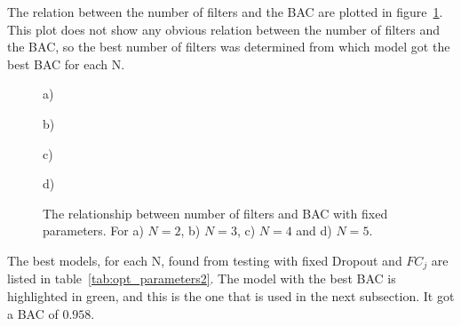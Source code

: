 The relation between the number of filters and the BAC are plotted in figure~\ref{fig:filter_acc}. This plot does not show any obvious relation between the number of filters and the BAC, so the best number of filters was determined from which model got the best BAC for each N.

\begin{figure}[H]
    \centering
    \begin{minipage}[b]{0.42\textwidth}
        
        \vspace{-0.5cm}
        \caption*{a)}
    \end{minipage}
    \begin{minipage}[b]{0.42\textwidth}
        
        \vspace{-0.5cm}
        \caption*{b)}
    \end{minipage}
    \begin{minipage}[b]{0.42\textwidth}
        
        \vspace{-0.5cm}
        \caption*{c)}
    \end{minipage}
    \begin{minipage}[b]{0.42\textwidth}
        
        \vspace{-0.5cm}
        \caption*{d)}
    \end{minipage}
    \captionsetup{width=0.95\linewidth}
    \caption{The relationship between number of filters and BAC with fixed parameters. For a) $N=2$, b) $N=3$, c) $N=4$ and d) $N=5$.}
    \label{fig:filter_acc}
\end{figure}

The best models, for each N, found from testing with fixed Dropout and $FC_j$ are listed in table~\ref{tab:opt_parameters2}. The model with the best BAC is highlighted in green, and this is the one that is used in the next subsection. It got a BAC of $0.958$.


